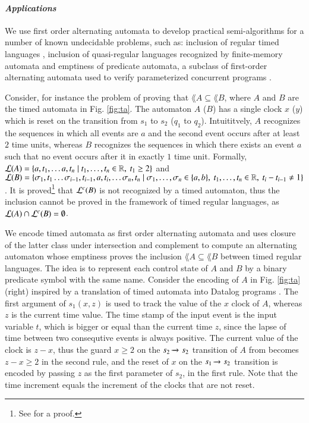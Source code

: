 \paragraph{\em Applications}
We use first order alternating automata to develop practical
semi-algorithms for a number of known undecidable problems, such as:
inclusion of regular timed languages \cite{AlurDill94}, inclusion of
quasi-regular languages recognized by finite-memory automata
\cite{KaminskiFrancez94} and emptiness of predicate automata, a
subclass of first-order alternating automata used to verify
parameterized concurrent programs \cite{Farzan15,Farzan16}.

Consider, for instance the problem of proving that $\lang{A} \subseteq
\lang{B}$, where $A$ and $B$ are the timed automata in
Fig. \ref{fig:ta}. The automaton $A$ ($B$) has a single clock $x$
($y$) which is reset on the transition from $s_1$ to $s_2$ ($q_1$ to
$q_2$). Intuititvely, $A$ recognizes the sequences in which all events
are $a$ and the second event occurs after at least $2$ time units,
whereas $B$ recognizes the sequences in which there exists an event
$a$ such that no event occurs after it in exactly $1$ time
unit. Formally, ${\mathcal L}({A}) = \{ a, t_1, \ldots a, t_n \mid t_1,
  \ldots, t_n \in {\bf \mathbb{R}},~ t_1 \geq 2 \}$ and ${\mathcal L}({B}) = \{ \sigma_1,
  t_1 \ldots \sigma_{i-1}, t_{i-1}, a, t_i, \ldots \sigma_n, t_n \mid
  \sigma_1, \ldots, \sigma_n \in \{ a,b \},~ t_1, \ldots, t_n \in
  {\bf \mathbb{R}},~ t_i-t_{i-1} \neq 1 \}$. It is proved\footnote{See
  \cite[Theorem 1]{AlurMadhusudan04} for a proof.} that ${\mathcal L}^c({B})$ is
not recognized by a timed automaton, thus the inclusion cannot be
proved in the framework of timed regular languages, as ${\mathcal L}({A}) \cap
{\mathcal L}^c({B}) = \emptyset$.

We encode timed automata as first order alternating automata and uses
closure of the latter class under intersection and complement to
compute an alternating automaton whose emptiness proves the inclusion
$\lang{A} \subseteq \lang{B}$ between timed regular languages. The
idea is to represent each control state of $A$ and $B$ by a binary
predicate symbol with the same name. Consider the encoding of $A$ in
Fig. \ref{fig:ta} (right) inspired by a translation of timed automata
into Datalog programs \cite{Fribourg98}. The first argument of
$s_1(x,z)$ is used to track the value of the $x$ clock of $A$, whereas
$z$ is the current time value. The time stamp of the input event is
the input variable $t$, which is bigger or equal than the current time
$z$, since the lapse of time between two consequtive events is always
positive. The current value of the clock is $z-x$, thus the guard $x
\geq 2$ on the $s_2 \xrightarrow{{\scriptscriptstyle }}_{{\scriptstyle }} s_2$ transition of $A$ from becomes
$z-x \geq 2$ in the second rule, and the reset of $x$ on the $s_1
\xrightarrow{{\scriptscriptstyle }}_{{\scriptstyle }} s_2$ transition is encoded by passing $z$ as the first
parameter of $s_2$, in the first rule. Note that the time increment
equals the increment of the clocks that are not reset.

